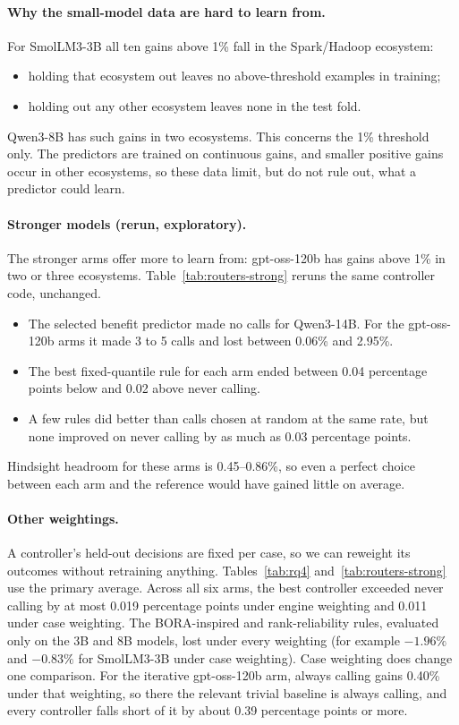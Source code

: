 \paragraph{Why the small-model data are hard to learn from.} For SmolLM3-3B all ten gains above 1\% fall in the Spark/Hadoop ecosystem:
\begin{itemize}
  \item holding that ecosystem out leaves no above-threshold examples in training;
  \item holding out any other ecosystem leaves none in the test fold.
\end{itemize}
Qwen3-8B has such gains in two ecosystems. This concerns the 1\% threshold only. The predictors are trained on continuous gains, and smaller positive gains occur in other ecosystems, so these data limit, but do not rule out, what a predictor could learn.

\paragraph{Stronger models (rerun, exploratory).} The stronger arms offer more to learn from: gpt-oss-120b has gains above 1\% in two or three ecosystems. Table~\ref{tab:routers-strong} reruns the same controller code, unchanged.
\begin{itemize}
  \item The selected benefit predictor made no calls for Qwen3-14B. For the gpt-oss-120b arms it made 3 to 5 calls and lost between 0.06\% and 2.95\%.
  \item The best fixed-quantile rule for each arm ended between 0.04 percentage points below and 0.02 above never calling.
  \item A few rules did better than calls chosen at random at the same rate, but none improved on never calling by as much as 0.03 percentage points.
\end{itemize}
Hindsight headroom for these arms is 0.45--0.86\%, so even a perfect choice between each arm and the reference would have gained little on average.

\paragraph{Other weightings.} A controller's held-out decisions are fixed per case, so we can reweight its outcomes without retraining anything. Tables~\ref{tab:rq4} and~\ref{tab:routers-strong} use the primary average. Across all six arms, the best controller exceeded never calling by at most 0.019 percentage points under engine weighting and 0.011 under case weighting. The BORA-inspired and rank-reliability rules, evaluated only on the 3B and 8B models, lost under every weighting (for example $-1.96\%$ and $-0.83\%$ for SmolLM3-3B under case weighting). Case weighting does change one comparison. For the iterative gpt-oss-120b arm, always calling gains 0.40\% under that weighting, so there the relevant trivial baseline is always calling, and every controller falls short of it by about 0.39 percentage points or more.

